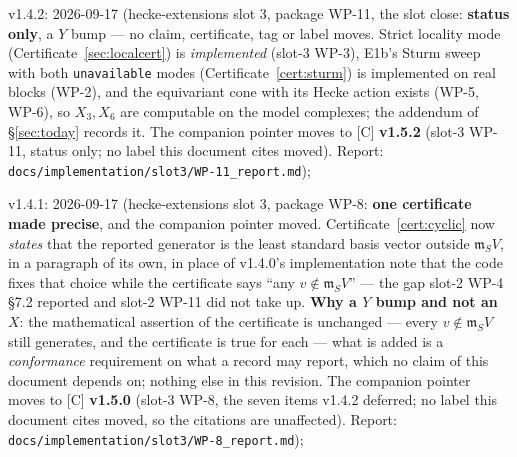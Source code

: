 \documentclass[11pt]{article}
\theoremstyle{remark}
\newcommand{\m}{\mathfrak{m}}
\begin{document}
v1.4.2: 2026-09-17 (hecke-extensions slot 3, package WP-11, the slot close:
\textbf{status only}, a $Y$ bump --- no claim, certificate, tag or label moves. Strict
locality mode (Certificate~\ref{sec:localcert}) is \emph{implemented} (slot-3 WP-3), E1b's
Sturm sweep with both \texttt{unavailable} modes (Certificate~\ref{cert:sturm}) is
implemented on real blocks (WP-2), and the equivariant cone with its Hecke action exists
(WP-5, WP-6), so $X_3,X_6$ are computable on the model complexes; the addendum of
\S\ref{sec:today} records it. The companion pointer moves to [C] \textbf{v1.5.2} (slot-3
WP-11, status only; no label this document cites moved). Report:
\texttt{docs/implementation/slot3/WP-11\_report.md});

v1.4.1: 2026-09-17 (hecke-extensions slot 3, package WP-8: \textbf{one
certificate made precise}, and the companion pointer moved. Certificate~\ref{cert:cyclic}
now \emph{states} that the reported generator is the least standard basis vector outside
$\m_SV$, in a paragraph of its own, in place of v1.4.0's implementation note that the code
fixes that choice while the certificate says ``any $v\notin\m_SV$'' --- the gap slot-2
WP-4 \S7.2 reported and slot-2 WP-11 did not take up. \textbf{Why a $Y$ bump and not an
$X$}: the mathematical assertion of the certificate is unchanged --- every $v\notin\m_SV$
still generates, and the certificate is true for each --- what is added is a
\emph{conformance} requirement on what a record may report, which no claim of this
document depends on; nothing else in this revision. The companion pointer moves to
[C] \textbf{v1.5.0} (slot-3 WP-8, the seven items v1.4.2 deferred; no label this document
cites moved, so the citations are unaffected). Report:
\texttt{docs/implementation/slot3/WP-8\_report.md});
\end{document}
